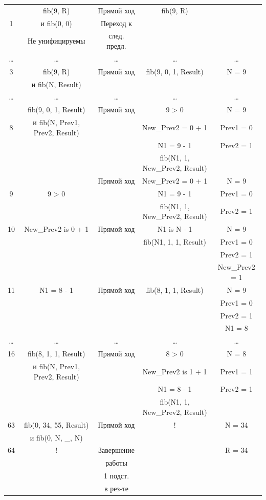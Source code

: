 \begin{landscape}
\begin{longtable}{|c|c|c|c|c|}
        \hline
              & fib(9, R) & Прямой ход & fib(9, R) & \\
            1 & и fib(0, 0) & Переход к & &\\
			  & Не унифицируемы & след. предл. & &\\
			\hline
			\dots & \dots & \dots & \dots & \dots \\
			\hline 
			3 & fib(9, R) & Прямой ход & fib(9, 0, 1, Result) & N = 9\\
              & и fib(N, Result) & & &\\
            \hline
			\dots & \dots & \dots & \dots & \dots \\
		    \hline 
			  & fib(9, 0, 1, Result) & Прямой ход & 9 > 0 & N = 9\\
            8 & и fib(N, Prev1, Prev2, Result) & & New\_Prev2 = 0 + 1 & Prev1 = 0\\
              & & & N1 = 9 - 1 & Prev2 = 1\\
              & & & fib(N1, 1, New\_Prev2, Result) &\\
            \hline 
			  & & Прямой ход & New\_Prev2 = 0 + 1 & N = 9\\
            9 & 9 > 0 & & N1 = 9 - 1 & Prev1 = 0\\
              & & & fib(N1, 1, New\_Prev2, Result) & Prev2 = 1\\
            \hline 
			10 & New\_Prev2 is 0 + 1 & Прямой ход & N1 is N - 1 & N = 9\\
              & & & fib(N1, 1, 1, Result) & Prev1 = 0\\
              & & & & Prev2 = 1\\
              & & & & New\_Prev2 = 1\\
            \hline 
			11 & N1 = 8 - 1 & Прямой ход & fib(8, 1, 1, Result) & N = 9\\
              & & & & Prev1 = 0\\
              & & & & Prev2 = 1\\
              & & & & N1 = 8\\
            \hline
			\dots & \dots & \dots & \dots & \dots \\
            \hline 
			16 & fib(8, 1, 1, Result) & Прямой ход & 8 > 0 & N = 8\\
              & и fib(N, Prev1, Prev2, Result) & & New\_Prev2 is 1 + 1 & Prev1 = 1\\
              & & & N1 = 8 - 1 & Prev2 = 1\\
              & & & fib(N1, 1, New\_Prev2, Result) & \\
            \hline 
			63 & fib(0, 34, 55, Result) & Прямой ход & ! & N = 34\\
              & и fib(0, N, \_, N) & & & \\
			\hline
            64  & ! & Завершение & & R = 34 \\
              & & работы & &\\
              & & 1 подст. & & \\
              & & в рез-те & & \\
    \end{longtable}
\end{landscape}

